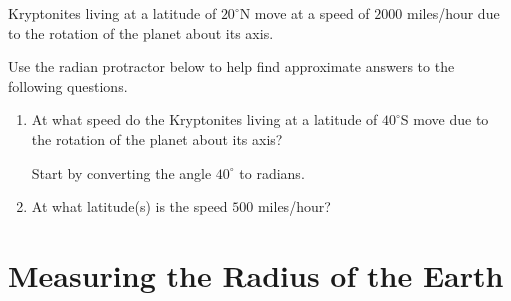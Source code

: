 \documentclass{ximera}
\begin{document}
\begin{question} \label{Q6721:Angles}
Kryptonites living at a latitude of $20^\circ$N move at a speed of $2000$ miles/hour due to the rotation of the planet about its axis.

Use the radian protractor below to help find approximate answers to the following questions.

\begin{enumerate}
\item  At what speed do the Kryptonites living at a latitude of $40^\circ$S move due to the rotation of the planet about its axis?
\begin{hint}
Start by converting the angle $40^\circ$ to radians.
\end{hint}

\item At what latitude(s) is the speed $500$ miles/hour?
\end{enumerate}

\begin{exploration}
 
\begin{onlineOnly}
    \begin{center}
\end{center}
\end{onlineOnly}
\end{exploration}

\end{question}


\section{Measuring the Radius of the Earth}
\end{document}
